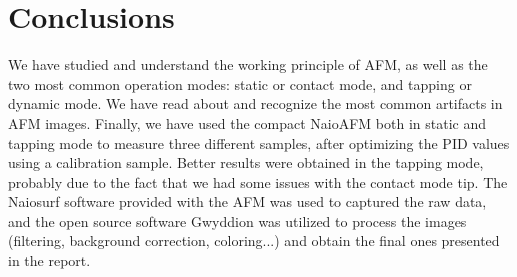 \documentclass[11pt,a4paper]{article}
\begin{document}
\section{Conclusions}
We have studied and understand the working principle of AFM, as well as the two most common operation modes: static or contact mode, and tapping or dynamic mode. We have read about and recognize the most common artifacts in AFM images. Finally, we have used the compact NaioAFM both in static and tapping mode to measure three different samples, after optimizing the PID values using a calibration sample. Better results were obtained in the tapping mode, probably due to the fact that we had some issues with the contact mode tip. The Naiosurf software provided with the AFM was used to captured the raw data, and the open source software Gwyddion was utilized to process the images (filtering, background correction, coloring...) and obtain the final ones presented in the report.

\nocite{*}
\vfill


\end{document}
